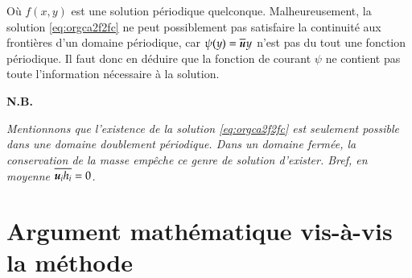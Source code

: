\documentclass[10pt]{article}
\numberwithin{equation}{section}
\newcommand{\uu}{\vb*{u}}
\begin{document}
Où \(f(x,y)\) est une solution périodique quelconque. 
Malheureusement, la solution \ref{eq:orgca2f2fc} ne peut possiblement pas satisfaire la continuité aux frontières d'un domaine périodique, car \(\psi(y) = \overline{\uu} y\) n'est pas du tout une fonction périodique.
Il faut donc en déduire que la fonction de courant \(\psi\) ne contient pas toute l'information nécessaire à la solution.\bigskip

\textbf{N.B.\ } \begin{minipage}[t]{0.94\linewidth}
   \itshape Mentionnons que l'existence de la solution \ref{eq:orgca2f2fc} est seulement possible dans une domaine doublement périodique.
   Dans un domaine fermée, la conservation de la masse empêche ce genre de solution d'exister. Bref, en moyenne \(\overline{\uu_i h_i} = 0\).
\end{minipage}


\section{Argument mathématique vis-à-vis la méthode}
\label{sec:org91276a6}
\end{document}
